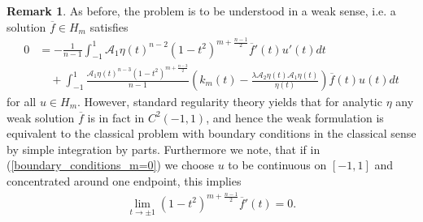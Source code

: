 \documentclass[12pt,twoside]{amsart}
\numberwithin{satz}{section}
\theoremstyle{definition}
\newtheorem{remark}[satz]{Remark}
\numberwithin{equation}{section}
\begin{document}
	\begin{remark}\label{remark_weak_solution}
		As before, the problem is to be understood in a weak sense, i.e. a solution $\overline{f}\in H_m$ satisfies
		\begin{align*}
			0 & = -\frac{1}{n-1}\int_{-1}^1 \mathcal{A}_1\eta(t)^{n-2}(1-t^2)^{m+\frac{n-1}{2}}\overline{f}'(t)u'(t)dt \\
			& \quad + \int_{-1}^1 \frac{\mathcal{A}_1\eta(t)^{n-3}(1-t^2)^{m+\frac{n-3}{2}}}{n-1}\left(k_m(t)-\frac{\lambda \mathcal{A}_2\eta(t)\mathcal{A}_1\eta(t)}{\eta(t)}\right)\overline{f}(t)u(t)dt
		\end{align*} 
		for all $u\in H_m$. However, standard regularity theory yields that for analytic $\eta$ any weak solution $\overline{f}$ is in fact in $C^2(-1,1)$, and hence the weak formulation is equivalent to the classical problem with boundary conditions in the classical sense by simple integration by parts. Furthermore we note, that if in (\ref{boundary_conditions_m=0}) we choose $u$ to be continuous on $[-1,1]$ and concentrated around one endpoint, this implies 
		\begin{align}\label{strong_Neumann_bc}
			\lim\limits_{t\to\pm 1} (1-t^2)^{m+\frac{n-1}{2}}\overline{f}'(t)=0.
		\end{align}
	\end{remark}
	
\end{document}
